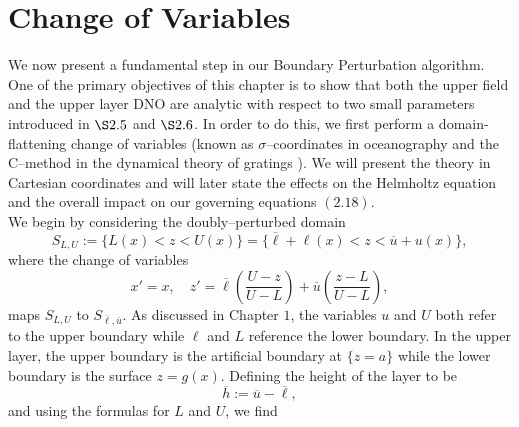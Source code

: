 
\section{Change of Variables}
\label{intro:change_of_variables}
We now present a fundamental step in our Boundary Perturbation algorithm. One of the primary objectives of this chapter is to show that both the upper field and the upper layer DNO are analytic with respect to two small parameters introduced in $\S 2.5$ and $\S 2.6$. In order to do this, we first perform a domain-flattening change of variables (known as $\sigma$--coordinates in oceanography \cite{Phillips57} and the C--method in the dynamical theory of gratings \cite{CDCM82,CMR80}). We will present the theory in Cartesian coordinates and will later state the effects on the Helmholtz equation and the overall impact on our governing equations $(2.18)$.
\newline
\\
We begin by considering the doubly--perturbed domain
\begin{equation}
S_{L,U}:=\{L(x)<z<U(x)\}=\{\overline{\ell}+\ell(x)<z<\overline{u}+u(x)\},    
\end{equation}
where the change of variables 
\begin{equation}
    x'=x,\quad z'=\overline{\ell}\left(\frac{U-z}{U-L}\right)+\overline{u}\left(\frac{z-L}{U-L}\right),
\end{equation}
maps $S_{L,U}$ to $S_{\overline{\ell},\overline{u}}$. As discussed in Chapter $1$, the variables $u$ and $U$ both refer to the upper boundary while $\ell$ and $L$ reference the lower boundary. In the upper layer, the upper boundary is the artificial boundary at $\{z=a\}$ while the lower boundary is the surface $z=g(x)$. Defining the height of the layer to be
$$\overline{h}:=\overline{u}-\overline{\ell},$$
and using the formulas for $L$ and $U$, we find

